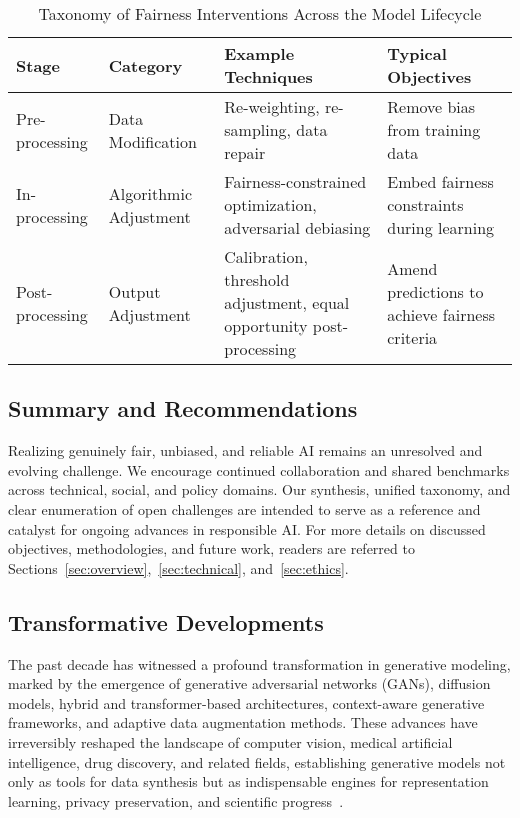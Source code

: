 \documentclass[sigconf]{acmart}
\begin{document}
\begin{table*}[htbp]
\centering
\caption{Taxonomy of Fairness Interventions Across the Model Lifecycle}
\label{tab:taxonomy_summary}
\begin{adjustbox}{max width=\textwidth}
\begin{tabular}{@{}llll@{}}
\toprule
Stage & Category & Example Techniques & Typical Objectives \\
\midrule
Pre-processing & Data Modification & Re-weighting, re-sampling, data repair & Remove bias from training data \\
In-processing & Algorithmic Adjustment & Fairness-constrained optimization, adversarial debiasing & Embed fairness constraints during learning \\
Post-processing & Output Adjustment & Calibration, threshold adjustment, equal opportunity post-processing & Amend predictions to achieve fairness criteria \\
\bottomrule
\end{tabular}
\end{adjustbox}
\end{table*}

\subsection{Summary and Recommendations}
Realizing genuinely fair, unbiased, and reliable AI remains an unresolved and evolving challenge. We encourage continued collaboration and shared benchmarks across technical, social, and policy domains. Our synthesis, unified taxonomy, and clear enumeration of open challenges are intended to serve as a reference and catalyst for ongoing advances in responsible AI. For more details on discussed objectives, methodologies, and future work, readers are referred to Sections~\ref{sec:overview},~\ref{sec:technical}, and~\ref{sec:ethics}.

\subsection{Transformative Developments}

The past decade has witnessed a profound transformation in generative modeling, marked by the emergence of generative adversarial networks (GANs), diffusion models, hybrid and transformer-based architectures, context-aware generative frameworks, and adaptive data augmentation methods. These advances have irreversibly reshaped the landscape of computer vision, medical artificial intelligence, drug discovery, and related fields, establishing generative models not only as tools for data synthesis but as indispensable engines for representation learning, privacy preservation, and scientific progress~\cite{ref74,ref75,ref81,ref82,ref90,ref91,ref92,ref93,ref94,ref95,ref96,ref97,ref98,ref99,ref100,ref101,ref102}.
\end{document}
